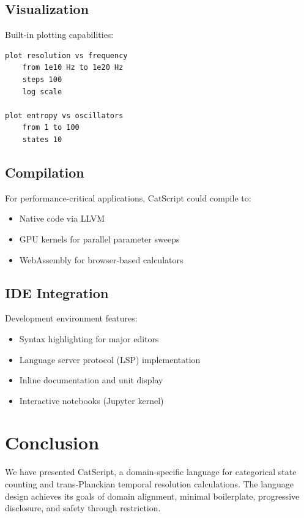\documentclass[twocolumn,10pt]{article}
\begin{document}
\subsection{Visualization}

Built-in plotting capabilities:
\begin{lstlisting}
plot resolution vs frequency
    from 1e10 Hz to 1e20 Hz
    steps 100
    log scale

plot entropy vs oscillators
    from 1 to 100
    states 10
\end{lstlisting}

\subsection{Compilation}

For performance-critical applications, CatScript could compile to:
\begin{itemize}
    \item Native code via LLVM
    \item GPU kernels for parallel parameter sweeps
    \item WebAssembly for browser-based calculators
\end{itemize}

\subsection{IDE Integration}

Development environment features:
\begin{itemize}
    \item Syntax highlighting for major editors
    \item Language server protocol (LSP) implementation
    \item Inline documentation and unit display
    \item Interactive notebooks (Jupyter kernel)
\end{itemize}

\section{Conclusion}
\label{sec:conclusion}

We have presented CatScript, a domain-specific language for categorical state counting and trans-Planckian temporal resolution calculations. The language design achieves its goals of domain alignment, minimal boilerplate, progressive disclosure, and safety through restriction.
\end{document}
